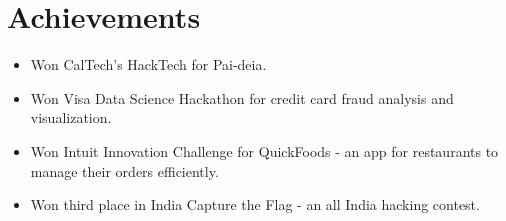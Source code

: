 \newcommand\textlcsc[1]{\textsc{\MakeTextLowercase{#1}}}
\section{Achievements}
\begin{itemize}
\item Won CalTech's HackTech for Pai-deia.
\item Won Visa Data Science Hackathon for credit card fraud analysis and visualization.
\item Won Intuit Innovation Challenge for QuickFoods - an app for restaurants to manage their orders efficiently. 
\item Won third place in India Capture the Flag - an all India hacking contest.
\end{itemize}